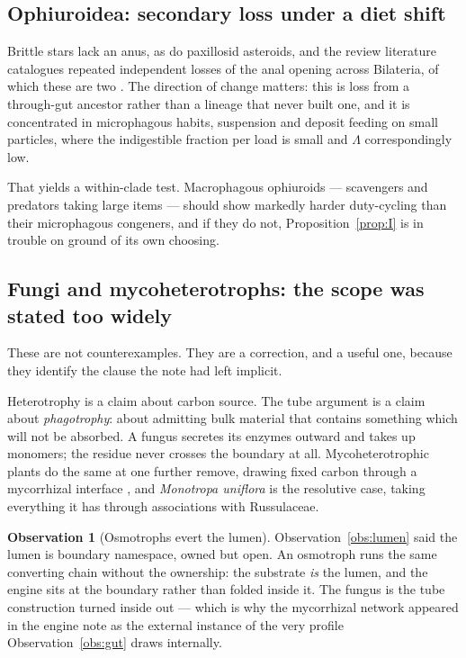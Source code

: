 \documentclass[11pt]{article}
\theoremstyle{plain}
\theoremstyle{definition}
\newtheorem{observation}[theorem]{Observation}
\begin{document}
\subsection{Ophiuroidea: secondary loss under a diet shift}

Brittle stars lack an anus, as do paxillosid asteroids, and the review literature catalogues repeated
independent losses of the anal opening across Bilateria, of which these are two
\cite{hejnol2015,jangoux1982}. The direction of change matters: this is loss from a through-gut
ancestor rather than a lineage that never built one, and it is concentrated in microphagous habits,
suspension and deposit feeding on small particles, where the indigestible fraction per load is small
and $\Lambda$ correspondingly low.

That yields a within-clade test. Macrophagous ophiuroids --- scavengers and predators taking large
items --- should show markedly harder duty-cycling than their microphagous congeners, and if they do
not, Proposition~\ref{prop:I} is in trouble on ground of its own choosing.

\subsection{Fungi and mycoheterotrophs: the scope was stated too widely}

These are not counterexamples. They are a correction, and a useful one, because they identify the
clause the note had left implicit.

Heterotrophy is a claim about carbon source. The tube argument is a claim about \emph{phagotrophy}:
about admitting bulk material that contains something which will not be absorbed. A fungus secretes
its enzymes outward and takes up monomers; the residue never crosses the boundary at all.
Mycoheterotrophic plants do the same at one further remove, drawing fixed carbon through a
mycorrhizal interface \cite{leake1994,bidartondo2005}, and \emph{Monotropa uniflora} is the
resolutive case, taking everything it has through associations with Russulaceae.

\begin{observation}[Osmotrophs evert the lumen]
\label{obs:evert}
Observation~\ref{obs:lumen} said the lumen is boundary namespace, owned but open. An osmotroph runs
the same converting chain without the ownership: the substrate \emph{is} the lumen, and the engine
sits at the boundary rather than folded inside it. The fungus is the tube construction turned inside
out --- which is why the mycorrhizal network appeared in the engine note as the external instance of
the very profile Observation~\ref{obs:gut} draws internally.
\end{observation}
\end{document}
